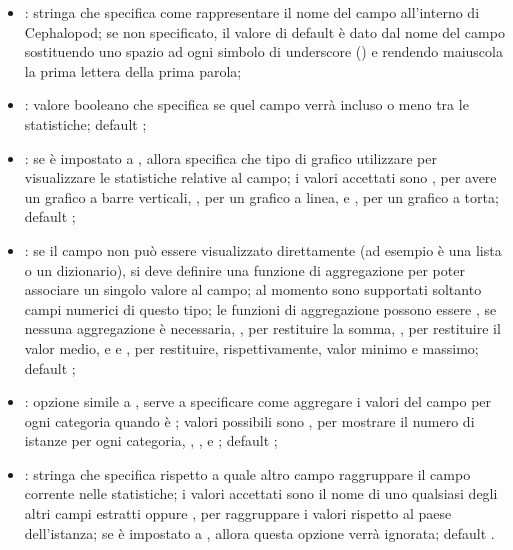             \begin{itemize}
                \item {}: stringa che specifica come rappresentare il nome del campo all'interno di Cephalopod; se non specificato, il valore di default è dato dal nome del campo sostituendo uno spazio ad ogni simbolo di underscore (\python{_}) e rendendo maiuscola la prima lettera della prima parola;
                \item {}: valore booleano che specifica se quel campo verrà incluso o meno tra le statistiche; default ;
                \item {}: se  è impostato a , allora specifica che tipo di grafico utilizzare per visualizzare le statistiche relative al campo; i valori accettati sono , per avere un grafico a barre verticali, , per un grafico a linea, e , per un grafico a torta; default ;
                \item {}: se il campo non può essere visualizzato direttamente (ad esempio è una lista o un dizionario), si deve definire una funzione di aggregazione per poter associare un singolo valore al campo; al momento sono supportati soltanto campi numerici di questo tipo; le funzioni di aggregazione possono essere , se nessuna aggregazione è necessaria, , per restituire la somma, , per restituire il valor medio, e  e , per restituire, rispettivamente, valor minimo e massimo; default ;
                \item {}: opzione simile a , serve a specificare come aggregare i valori del campo per ogni categoria quando  è ; valori possibili sono , per mostrare il numero di istanze per ogni categoria, , ,  e ; default ;
                \item {}: stringa che specifica rispetto a quale altro campo raggruppare il campo corrente nelle statistiche; i valori accettati sono il nome di uno qualsiasi degli altri campi estratti oppure , per raggruppare i valori rispetto al paese dell'istanza; se  è impostato a , allora questa opzione verrà ignorata; default .
            \end{itemize}
            
